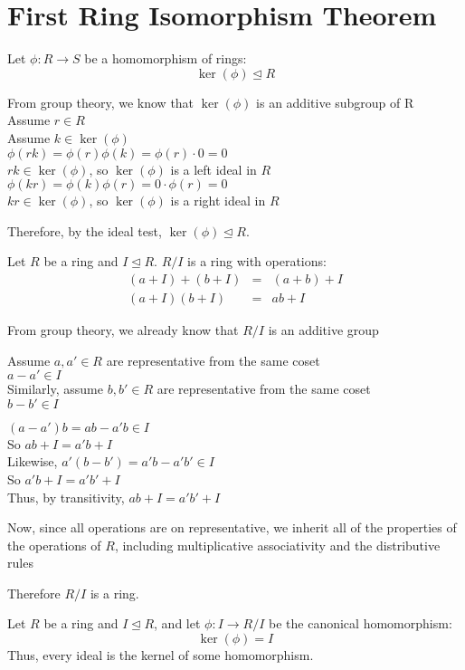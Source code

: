\documentclass[letterpaper,12pt,fleqn]{article}
\newcommand{\ide}{\trianglelefteq}
\begin{document}
\section*{First Ring Isomorphism Theorem}

\begin{theorem}
  Let $\phi:R\to S$ be a homomorphism of rings:
  \[\ker(\phi)\ide R\]
\end{theorem}

\begin{theproof}
  From group theory, we know that $\ker(\phi)$ is an additive subgroup of R \\
  Assume $r\in R$ \\
  Assume $k\in \ker(\phi)$ \\
  $\phi(rk)=\phi(r)\phi(k)=\phi(r)\cdot0=0$ \\
  $rk\in\ker(\phi)$, so $\ker(\phi)$ is a left ideal in $R$ \\
  $\phi(kr)=\phi(k)\phi(r)=0\cdot\phi(r)=0$ \\
  $kr\in\ker(\phi)$, so $\ker(\phi)$ is a right ideal in $R$

  Therefore, by the ideal test, $\ker(\phi)\ide R$.
\end{theproof}

\begin{theorem}
  Let $R$ be a ring and $I\ide R$. $R/I$ is a ring with operations:
  \begin{eqnarray*}
    (a+I)+(b+I) &=& (a+b)+I \\
    (a+I)(b+I) &=& ab+I
  \end{eqnarray*}
\end{theorem}

\begin{theproof}
  From group theory, we already know that $R/I$ is an additive group

  Assume $a,a'\in R$ are representative from the same coset \\
  $a-a'\in I$ \\
  Similarly, assume $b,b'\in R$ are representative from the same coset \\
  $b-b'\in I$

  $(a-a')b=ab-a'b\in I$ \\
  So $ab+I=a'b+I$ \\
  Likewise, $a'(b-b')=a'b-a'b'\in I$ \\
  So $a'b+I=a'b'+I$ \\
  Thus, by transitivity, $ab+I=a'b'+I$

  Now, since all operations are on representative, we inherit all of the properties of
  the operations of $R$, including multiplicative associativity and the distributive
  rules

  Therefore $R/I$ is a ring.
\end{theproof}
\newpage
\begin{theorem}
  Let $R$ be a ring and $I\ide R$, and let $\phi:I\to R/I$ be the canonical homomorphism:
  \[\ker(\phi)=I\]
  Thus, every ideal is the kernel of some homomorphism.
\end{theorem}
\end{document}
